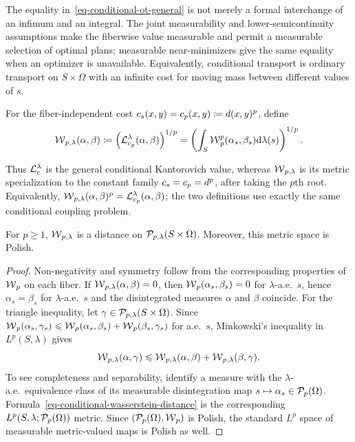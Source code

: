 The equality in~\eqref{eq-conditional-ot-general} is not merely a formal interchange of an infimum and an integral. The joint measurability and lower-semicontinuity assumptions make the fiberwise value measurable and permit a measurable selection of optimal plans; measurable near-minimizers give the same equality when an optimizer is unavailable. Equivalently, conditional transport is ordinary transport on $S\times\Omega$ with an infinite cost for moving mass between different values of $s$.

\begin{defn}\label{def-conditional-wasserstein-distance}
	For the fiber-independent cost $c_s(x,y)=c_p(x,y)\coloneqq d(x,y)^p$, define
	\begin{equation}\label{eq-conditional-wasserstein-distance}
		\operatorname{\mathcal{W}}_{p,\lambda}(\alpha,\beta)
		\coloneqq
		\left(\mathcal{L}_{c_p}^\lambda(\alpha,\beta)\right)^{1/p}
		=
		\left(
		\int_S \operatorname{\mathcal{W}}_p^p(\alpha_s,\beta_s)\mathrm{d}\lambda(s)
		\right)^{1/p}.
	\end{equation}
\end{defn}
Thus $\mathcal{L}_c^\lambda$ is the general conditional Kantorovich value, whereas $\operatorname{\mathcal{W}}_{p,\lambda}$ is its metric specialization to the constant family $c_s=c_p=d^p$, after taking the $p$th root. Equivalently,
$\operatorname{\mathcal{W}}_{p,\lambda}(\alpha,\beta)^p = \mathcal{L}_{c_p}^\lambda(\alpha,\beta)$;
the two definitions use exactly the same conditional coupling problem.

\begin{prop}\label{prop-conditional-wasserstein-distance}
	For $p\geq1$, $\operatorname{\mathcal{W}}_{p,\lambda}$ is a distance on $\mathcal{P}_{p,\lambda}(S\times\Omega)$. Moreover, this metric space is Polish.
\end{prop}
\begin{proof}
	Non-negativity and symmetry follow from the corresponding properties of $\operatorname{\mathcal{W}}_p$ on each fiber. If $\operatorname{\mathcal{W}}_{p,\lambda}(\alpha,\beta)=0$, then $\operatorname{\mathcal{W}}_p(\alpha_s,\beta_s)=0$ for $\lambda$-a.e.\ $s$, hence $\alpha_s=\beta_s$ for $\lambda$-a.e.\ $s$ and the disintegrated measures $\alpha$ and $\beta$ coincide. For the triangle inequality, let $\gamma\in\mathcal{P}_{p,\lambda}(S\times\Omega)$. Since $\operatorname{\mathcal{W}}_p(\alpha_s,\gamma_s)\leqslant\operatorname{\mathcal{W}}_p(\alpha_s,\beta_s)+\operatorname{\mathcal{W}}_p(\beta_s,\gamma_s)$ for a.e.\ $s$, Minkowski's inequality in $L^p(S,\lambda)$ gives
	\[
		\operatorname{\mathcal{W}}_{p,\lambda}(\alpha,\gamma)
		\leqslant
		\operatorname{\mathcal{W}}_{p,\lambda}(\alpha,\beta)+\operatorname{\mathcal{W}}_{p,\lambda}(\beta,\gamma).
	\]
	To see completeness and separability, identify a measure with the $\lambda$-a.e.\ equivalence class of its measurable disintegration map $s\mapsto\alpha_s\in\mathcal{P}_p(\Omega)$. Formula~\eqref{eq-conditional-wasserstein-distance} is the corresponding $L^p(S,\lambda;\mathcal{P}_p(\Omega))$ metric. Since $(\mathcal{P}_p(\Omega),\operatorname{\mathcal{W}}_p)$ is Polish, the standard $L^p$ space of measurable metric-valued maps is Polish as well.
\end{proof}

